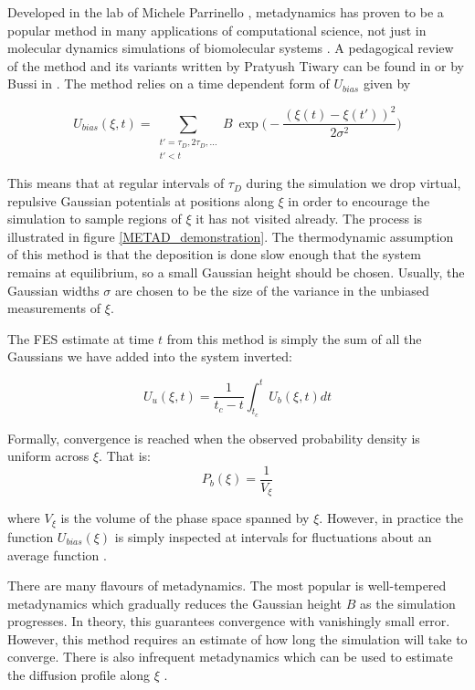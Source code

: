 Developed in the lab of Michele Parrinello \cite{laio2002}, metadynamics has proven to be a popular method in many applications of computational science, not just in molecular dynamics simulations of biomolecular systems \cite{cheng2017, giberti2015, bussi2020a}. A pedagogical review of the method and its variants written by Pratyush Tiwary can be found in \cite{bussi2020} or by Bussi in \cite{bussi2015}. The method relies on a time dependent form of $U_{bias}$ given by 

\begin{equation}
	U_{bias} (\xi,t) = \sum\limits_{\substack{t' = \tau_D, 2 \tau_D,... \\ t' < t}}  B \ \exp\bigg( - \frac{(\xi(t) - \xi(t') )^2}{2\sigma^2 }\bigg)
\end{equation}

This means that at regular intervals of $\tau_D$ during the simulation we drop virtual, repulsive Gaussian potentials at positions along $\xi$ in order to encourage the simulation to sample regions of $\xi$ it has not visited already. The process is illustrated in figure \ref{METAD_demonstration}. The thermodynamic assumption of this method is that the deposition is done slow enough that the system remains at equilibrium, so a small Gaussian height should be chosen. Usually, the Gaussian widths $\sigma$ are chosen to be the size of the variance in the unbiased measurements of $\xi$. 

The FES estimate at time $t$ from this method is simply the sum of all the Gaussians we have added into the system inverted:  

\begin{equation}
	U_u (\xi,t)  =  \frac{1}{t_c-t} \int_{t_c}^t U_b(\xi,t) dt
\end{equation}

Formally, convergence is reached when the observed probability density is uniform across $\xi$. That is:
\begin{equation}
	P_b (\xi)= \frac{1}{V_\xi } 
	\label{convergence_criterion_metad}
\end{equation}

where $V_\xi$ is the volume of the phase space spanned by $\xi$. However, in practice the function $U_{bias}(\xi)$ is simply inspected at intervals for fluctuations about an average function \cite{sun2016}. 

There are many flavours of metadynamics. The most popular is well-tempered metadynamics which gradually reduces the Gaussian height $B$ as the simulation progresses\cite{barducci2008}. In theory, this guarantees convergence with vanishingly small error. However, this method requires an estimate of how long the simulation will take to converge. There is also infrequent metadynamics which can be used to estimate the diffusion profile along $\xi$ \cite{tiwary2013, tiwary2016, salvalaglio2014, henin2022}.  

